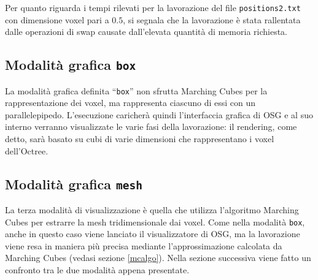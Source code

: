 Per quanto riguarda i tempi rilevati per la lavorazione del file \texttt{positions2.txt} con dimensione voxel pari a $0.5$, si segnala che la lavorazione è stata rallentata dalle operazioni di swap causate dall'elevata quantità di memoria richiesta.

\subsection{Modalità grafica \texttt{box}}
La modalità grafica definita ``\texttt{box}'' non sfrutta  Marching Cubes per la rappresentazione dei voxel, ma rappresenta ciascuno di essi con un parallelepipedo. L'esecuzione caricherà quindi l'interfaccia grafica di OSG e al suo interno verranno visualizzate le varie fasi della lavorazione: il rendering, come detto, sarà basato su cubi di varie dimensioni che rappresentano i voxel dell'Octree.

\subsection{Modalità grafica \texttt{mesh}}
La terza modalità di visualizzazione è quella che utilizza l'algoritmo Marching Cubes per estrarre la mesh tridimensionale dai voxel. Come nella modalità \texttt{box}, anche in questo caso viene lanciato il visualizzatore di OSG, ma la lavorazione viene resa in maniera più precisa mediante l'approssimazione calcolata da Marching Cubes (vedasi sezione \ref{mcalgo}). Nella sezione successiva viene fatto un confronto tra le due modalità appena presentate.

